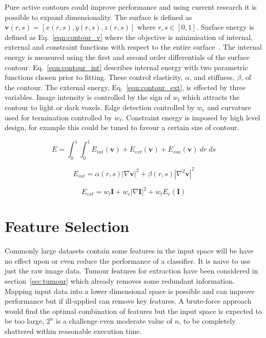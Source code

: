 \documentclass[journal]{IEEEtran}
\begin{document}
Pure active contours could improve performance and using current research it is possible to expand dimensionality.
The surface is defined as $\mathbf{v}(r,s) = [x(r,s),y(r,s),z(r,s)]$ where $r,s \in [0,1]$.
Surface energy is defined as Eq.~\eqref{eqn:contour_v} where the objective is minimisation of internal, external and constraint functions with respect to the entire surface~\cite{nixon02feature,skalski13automatic}. 
The internal energy is measured using the first and second order differentials of the surface contour.
Eq.~\eqref{eqn:contour_int} describes internal energy with two parametric functions chosen prior to fitting.
These control elasticity, $\alpha$, and stiffness, $\beta$, of the contour.
The external energy, Eq.~\ref{eqn:contour_ext}, is effected by three variables.
Image intensity is controlled by the sign of $w_l$ which attracts the contour to light or dark voxels.
Edge detection controlled by $w_e$ and curvature used for termination controlled by $w_t$.
Constraint energy is imposed by high level design, for example this could be tuned to favour a certain size of contour.


\begin{equation}
	E = \int_0^{1}\int_0^{1} E_{int}(\mathbf{v}) + E_{ext}(\mathbf{v}) + E_{con}(\mathbf{v})\:dr\;ds
	\label{eqn:contour_v}
\end{equation}

\begin{equation}
	 E_{int}= \alpha(r,s)\left|\nabla \mathbf{v}\right|^2 + \beta(r,s)\left|\nabla^2 \mathbf{v}\right|^2 
	 \label{eqn:contour_int}
\end{equation}

\begin{equation}
	 E_{ext}= w_{l}\mathbf{I} + w_{e}|\nabla \mathbf{I}|^2 + w_{t}E_c(\mathbf{I})
	 \label{eqn:contour_ext}
\end{equation}















\section{Feature Selection}
\label{sec:selection}

Commonly large datasets contain some features in the input space will be have no effect upon or even reduce the performance of a classifier.
It is naive to use just the raw image data.
Tumour features for extraction have been considered in section~\ref{sec:tumour} which already removes some redundant information. 
Mapping input data into a lower dimensional space is possible and can improve performance but if ill-applied can remove key features.
A brute-force approach would find the optimal combination of features but the input space is expected to be too large, $2^n$ is a challenge even moderate value of $n$, to be completely shattered within reasonable execution time. 
\end{document}
